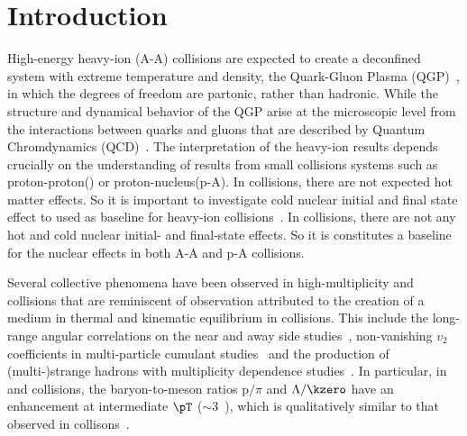 
\section{Introduction}%
\label{sec:Introduction}

High-energy heavy-ion (A-A) collisions are expected to create a deconfined system with extreme temperature and density, the Quark-Gluon Plasma (QGP)~\cite{Rafelski:126179, Satz:2000bn, Shuryak:1983ni, Jacak:2012dx, Cleymans:1985wb, Bass:1998vz, BraunMunzinger:2007zz}, in which the degrees of freedom are partonic, rather than hadronic.
While the structure and dynamical behavior of the QGP arise at the microscopic level from the interactions between quarks and gluons that are described by Quantum Chromdynamics (QCD)~\cite{Laermann:2003cv, Gupta:2011wh, Bhattacharya:2014ara}.
The interpretation of the heavy-ion results depends crucially on the understanding of results from small collisions systems such as proton-proton(\pp) or proton-nucleus(p-A).
In \pPb collisions, there are not expected hot matter effects.
So it is important to investigate cold nuclear initial and final state effect to used as baseline for heavy-ion collisions~\cite{Salgado:2011wc, Eskola:2016oht}.
In \pp collisions, there are not any hot and cold nuclear initial- and final-state effects.
So it is constitutes a baseline for the nuclear effects in both A-A and p-A collisions.

Several collective phenomena have been observed in high-multiplicity \pp and \pPb collisions that are reminiscent of observation attributed to the creation of a medium in thermal and kinematic equilibrium in \PbPb collisions.
This include the long-range angular correlations on the near and away side studies~\cite{Aad:2015gqa, Abelev:2012ola, ABELEV:2013wsa}, non-vanishing $v_{2}$ coefficients in multi-particle cumulant studies~\cite{Khachatryan:2015waa} and the production of (multi-)strange hadrons with multiplicity dependence studies~\cite{Abelev:2013haa, ALICE:2017jyt, Khachatryan:2016yru}.
In particular, in \pp and \pPb collisions, the baryon-to-meson ratios p$/\pi$ and $\Lambda/\kzero$ have an enhancement at intermediate $\pT$ ($\sim 3$~\GeVc), which is qualitatively similar to that observed in \PbPb collisons~\cite{Acharya:2018orn, Khachatryan:2016yru, Abelev:2013xaa, ALICE:2017jyt}.


